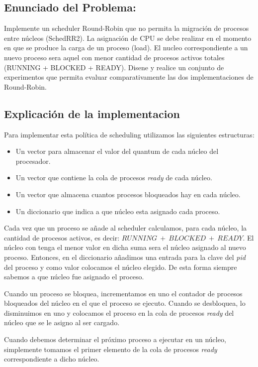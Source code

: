 \subsection{Enunciado del Problema:}

Implemente un scheduler Round-Robin que no permita la migración de procesos entre núcleos (SchedRR2). La asignación de CPU se debe realizar en el momento en que se produce la carga de un proceso (load). El nucleo correspondiente a un nuevo proceso sera aquel con menor cantidad de procesos activos totales (RUNNING + BLOCKED + READY). Disene y realice un conjunto de experimentos que permita evaluar comparativamente las dos implementaciones de Round-Robin.

\subsection{Explicación de la implementacion}

Para implementar esta política de scheduling utilizamos las siguientes estructuras:
\begin{itemize}
	\item Un vector para almacenar el valor del quantum de cada núcleo del procesador.
	\item Un vector que contiene la cola de procesos \textit{ready} de cada núcleo.
	\item Un vector que almacena cuantos procesos bloqueados hay en cada núcleo.
	\item Un diccionario que indica a que núcleo esta asignado cada proceso.
\end{itemize}

Cada vez que un proceso se añade al scheduler calculamos, para cada núcleo, la cantidad de procesos activos, es decir: $RUNNING\ +\ BLOCKED\ +\ READY$. El núcleo con tenga el menor valor en dicha suma sera el núcleo asignado al nuevo proceso.
Entonces, en el diccionario añadimos una entrada para la clave del \textit{pid} del proceso y como valor colocamos el núcleo elegido. De esta forma siempre sabemos a que núcleo fue asignado el proceso.

Cuando un proceso se bloquea, incrementamos en uno el contador de procesos bloqueados del núcleo en el que el proceso se ejecuto. Cuando se desbloquea, lo disminuimos en uno y colocamos el proceso en la cola de procesos \textit{ready} del núcleo que se le asigno al ser cargado.

Cuando debemos determinar el próximo proceso a ejecutar en un núcleo, simplemente tomamos el primer elemento de la cola de procesos \textit{ready} correspondiente a dicho núcleo.

